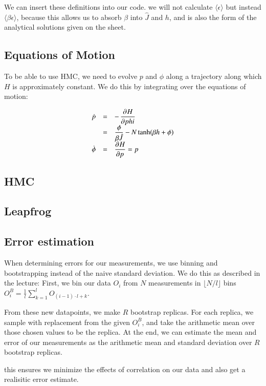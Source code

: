 \documentclass{scrartcl}
\begin{document}
We can insert these definitions into our code. we will not calculate $\langle \epsilon\rangle$ but instead $\langle \beta\epsilon\rangle$, because this allows us to absorb $\beta$ into $\hat{J}$ and $h$, and is also the form of the analytical solutions given on the sheet.



\subsection{Equations of Motion}

To be able to use HMC, we need to evolve $p$ and $\phi$ along a trajectory along which $H$ is approximately constant. We do this by integrating over the equations of motion:

\[\begin{array}{>{\displaystyle}r>{\displaystyle}c>{\displaystyle}l}
\dot{p}&=&-\dpd{H}{phi}\\
&=&\frac{\phi}{\beta \hat{J}}-N\tanh(\beta h+\phi)\\
\dot{\phi}&=&\dpd{H}{p}=p
\end{array}\]

\subsection{HMC}

\subsection{Leapfrog}

\subsection{Error estimation}
When determining errors for our measurements, we use binning and bootstrapping instead of the naive standard deviation. 
We do this as described in the lecture: First, we bin our data $O_i$ from $N$ measurements in $\lfloor N/l\rfloor$ bins $O^B_i=\frac{1}{l}\sum_{k=1}^l O_{(i-1)\cdot l+k}$. 

From these new datapoints, we make $R$ bootstrap replicas. For each replica, we sample with replacement from the given $O_i^B$, and take the arithmetic mean over those chosen values to be the replica. At the end, we can estimate the mean and error of our measurements as the arithmetic mean and standard deviation over $R$ bootstrap replicas.

this ensures we minimize the effects of correlation on our data and also get a realisitic error estimate.
\end{document}
